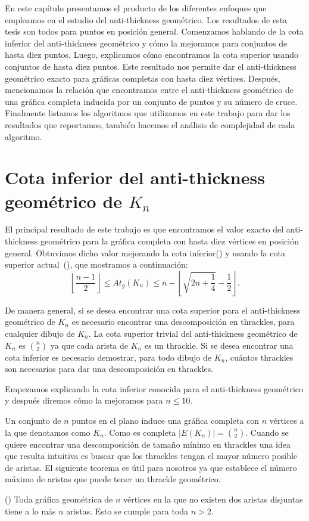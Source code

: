 En este capítulo presentamos el producto de los diferentes enfoques que empleamos en el estudio del
anti-thickness geométrico. Los resultados de esta tesis son todos para puntos en posición general.
Comenzamos hablando de la cota inferior del anti-thickness geométrico y
cómo la mejoramos para conjuntos de hasta diez puntos. Luego, explicamos cómo
encontramos la cota superior usando conjuntos de hasta diez puntos. Este
resultado nos permite dar el anti-thickness geométrico exacto para gráficas completas con hasta
diez vértices. Después, mencionamos la relación que encontramos entre el
anti-thickness geométrico de una gráfica completa inducida por un conjunto de puntos y su número de
cruce. Finalmente listamos los algoritmos que utilizamos en este trabajo para dar los resultados que reportamos, también hacemos el análisis de complejidad de cada algoritmo.


\section{Cota inferior del anti-thickness geométrico de $K_n$}\label{sec:cota_inf}
  El principal resultado de este trabajo es que encontramos el valor exacto del
  anti-thickness geométrico para la gráfica completa con hasta diez vértices en
  posición general. Obtuvimos dicho valor mejorando la cota inferior(\cite{Dujmovic2017})
  y usando la cota superior actual~(\cite{Fabila-Monroy2018}), que mostramos a continuación:
  \begin{equation}
  \left\lfloor\frac{n-1}{2}\right\rfloor \leq At_g(K_n) \leq n - \left\lfloor
  \sqrt{2n + \frac{1}{4}} - \frac{1}{2} \right\rfloor.
  \label{ecuacion_cotas_atg}
  \end{equation}

  De manera general, si se desea encontrar una cota superior para el
  anti-thickness geométrico de $K_n$ es necesario encontrar una descomposición en
  thrackles, para cualquier dibujo de $K_n$. La cota superior trivial del
  anti-thickness geométrico de $K_n$ es $\binom{n}{2}$ ya que cada arista de
  $K_n$ es un thrackle. Si se desea encontrar una cota inferior es necesario
  demostrar, para todo dibujo de $K_n$, cuántos thrackles son necesarios para dar
  una descomposición en thrackles.

  Empezamos explicando la cota inferior conocida para el anti-thickness
  geométrico y después diremos cómo la mejoramos para $n\leq 10$.

  Un conjunto de $n$ puntos en el plano induce una gráfica completa con $n$
  vértices a la que denotamos como $K_n$. Como es completa $|E(K_n)|=
  \binom{n}{2}$.
  Cuando se quiere encontrar una descomposición de tamaño mínimo en thrackles una
  idea que resulta intuitiva es buscar que los thrackles tengan el mayor número
  posible de aristas. El siguiente teorema es útil para nosotros ya que establece
  el número máximo de aristas que puede tener un thrackle geométrico.
  \begin{theorem}(\cite{Pach2013b})
    Toda gráfica geométrica de $n$ vértices en la
    que no existen dos aristas disjuntas tiene a lo más $n$ aristas. Esto se
    cumple para toda $n>2$.
  \end{theorem}

